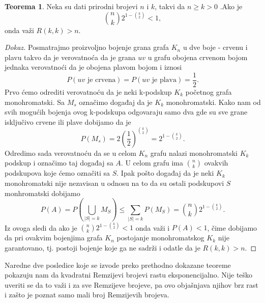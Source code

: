 \documentclass{article}
\theoremstyle{definition}
\newtheorem{teorema}{Teorema}[section]
\newcommand{\dokaz}[1]{\begin{proof}[Dokaz]#1\end{proof}}
\begin{document}
	\begin{teorema}\label{dot1}
		Neka su dati prirodni brojevi $n$ i $k$, takvi da $n \geq{k} > 0$ .Ako je $$\binom{n}{k}2^{1 - \binom{k}{2}} < 1 ,$$  onda važi $R(k, k) > n$.
		\dokaz{
			Posmatrajmo proizvoljno bojenje grana grafa $K_n$ u dve boje - crvenu i plavu takvo da je verovatnoća da je grana $uv$ u grafu obojena crvenom bojom jednaka verovatnoći da je 		           obojena plavom bojom i iznosi 
			$$P(uv \text{ je crvena}) = P(uv \text{ je plava}) = \frac{1}{2}.$$
			\newline
			Prvo ćemo odrediti verovatnoću da je neki k-podskup $K_k$ početnog grafa monohromatski. 
			Sa $M_s$ označimo događaj da je $K_k$ monohromatski. Kako nam od svih mogućih bojenja ovog k-podskupa odgovaraju samo dva gde su sve grane isključivo crvene ili plave dobijamo
			da je
			$$P(M_s) = 2\left(\frac{1}{2}\right)^{\binom{k}{2}} = 2 ^ {1 - \binom{k}{2}}.$$
			Odredimo sada verovatnoću da se u celom $K_n$ grafu nalazi monohromatski $K_k$ podskup i označimo taj događaj sa $A$. U celom grafu ima $\binom{n}{k}$ ovakvih podskupova koje 			ćemo označiti sa $S$. Ipak pošto događaj da je neki $K_k$ monohromatski nije nezavisan u odnosu na to da su ostali podskupovi $S$ monhromatski dobijamo 
			$$P(A) = P(\bigcup_{|S|=k}M_S) \leq{\sum_{|S|=k}P(M_S)} = \binom{n}{k} 2 ^ {1 - \binom{k}{2}}.$$
			Iz ovoga sledi da ako je $\binom{n}{k} 2 ^ {1 - \binom{k}{2}} < 1$ onda važi i $P(A) < 1$, čime dobijamo da pri ovakvim bojenjima grafa $K_n$ postojanje monohromatskog 
			$K_k$ nije garantovano, tj. postoji bojenje koje ga ne sadrži i odatle da je $R(k,k) > n$.
		}
	\end{teorema}
	Naredne dve posledice koje se izvode preko prethodno dokazane teoreme pokazuju nam da kvadratni Remzijevi brojevi rastu eksponencijalno. Nije teško
	uveriti se da to važi i za sve Remzijeve brojeve, pa ovo objašnjava njihov brz rast i zašto je poznat samo mali broj Remzijevih brojeva.
\end{document}
